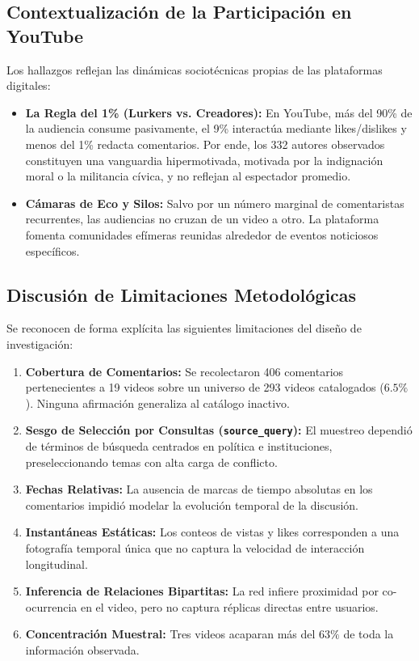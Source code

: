 \documentclass[11pt,a4paper]{article}
\begin{document}
\subsection{Contextualización de la Participación en YouTube}
Los hallazgos reflejan las dinámicas sociotécnicas propias de las plataformas digitales:
\begin{itemize}
    \item \textbf{La Regla del 1\% (Lurkers vs. Creadores):} En YouTube, más del 90\% de la audiencia consume pasivamente, el 9\% interactúa mediante likes/dislikes y menos del 1\% redacta comentarios. Por ende, los 332 autores observados constituyen una vanguardia hipermotivada, motivada por la indignación moral o la militancia cívica, y no reflejan al espectador promedio.
    \item \textbf{Cámaras de Eco y Silos:} Salvo por un número marginal de comentaristas recurrentes, las audiencias no cruzan de un video a otro. La plataforma fomenta comunidades efímeras reunidas alrededor de eventos noticiosos específicos.
\end{itemize}

\subsection{Discusión de Limitaciones Metodológicas}
Se reconocen de forma explícita las siguientes limitaciones del diseño de investigación:
\begin{enumerate}
    \item \textbf{Cobertura de Comentarios:} Se recolectaron 406 comentarios pertenecientes a 19 videos sobre un universo de 293 videos catalogados ($6.5\%$). Ninguna afirmación generaliza al catálogo inactivo.
    \item \textbf{Sesgo de Selección por Consultas (\texttt{source\_query}):} El muestreo dependió de términos de búsqueda centrados en política e instituciones, preseleccionando temas con alta carga de conflicto.
    \item \textbf{Fechas Relativas:} La ausencia de marcas de tiempo absolutas en los comentarios impidió modelar la evolución temporal de la discusión.
    \item \textbf{Instantáneas Estáticas:} Los conteos de vistas y likes corresponden a una fotografía temporal única que no captura la velocidad de interacción longitudinal.
    \item \textbf{Inferencia de Relaciones Bipartitas:} La red infiere proximidad por co-ocurrencia en el video, pero no captura réplicas directas entre usuarios.
    \item \textbf{Concentración Muestral:} Tres videos acaparan más del $63\%$ de toda la información observada.
\end{enumerate}
\end{document}
